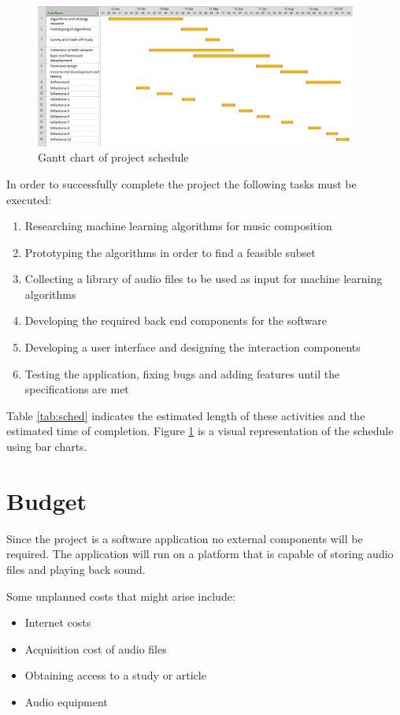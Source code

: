 \begin{figure}
\centerline{\includegraphics[width=400px]{../images/gantt.png}}
\caption{Gantt chart of project schedule}
\label{ims:gantt}
\end{figure}

In order to successfully complete the project the following tasks must be executed:
\begin{enumerate}
\item Researching machine learning algorithms for music composition
\item Prototyping the algorithms in order to find a feasible subset
\item Collecting a library of audio files to be used as input for machine learning algorithms
\item Developing the required back end components for the software
\item Developing a user interface and designing the interaction components
\item Testing the application, fixing bugs and adding features until the specifications are met 
\end{enumerate}
Table \ref{tab:sched} indicates the estimated length of these activities and the estimated time of completion. Figure \ref{ims:gantt} is a visual representation of the schedule using bar charts.

\section{Budget}
Since the project is a software application no external components will be required. The application will run on a platform that is capable of storing audio files and playing back sound.

Some unplanned costs that might arise include:
\begin{itemize}
\item Internet costs
\item Acquisition cost of audio files
\item Obtaining access to a study or article
\item Audio equipment
\end{itemize}
